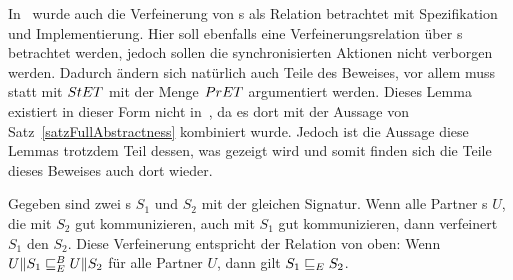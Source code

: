 In~\cite{Vogler2014EIO} wurde auch die Verfeinerung von \EIO{}s als Relation betrachtet
mit Spezifikation und Implementierung. Hier soll ebenfalls eine
Verfeinerungsrelation über \EIO{}s betrachtet werden, jedoch sollen die
synchronisierten Aktionen nicht verborgen werden. Dadurch ändern sich natürlich
auch Teile des Beweises, vor allem muss statt mit $StET{}$ mit der Menge
$PrET{}$ argumentiert werden. Dieses Lemma existiert in dieser Form nicht
in~\cite{Schlosser2012BA}, da es dort mit der Aussage von
Satz~\ref{satzFullAbstractness} kombiniert wurde. Jedoch ist die Aussage diese
Lemmas trotzdem Teil dessen, was gezeigt wird und somit finden sich die Teile
dieses Beweises auch dort wieder.

\begin{lem}
  \label{lemVerfeinerung}
  Gegeben sind zwei \EIO{}s $S_1$ und $S_2$ mit der gleichen Signatur. Wenn
  alle Partner \EIO{}s $U$, die mit $S_2$ gut kommunizieren, auch mit $S_1$ gut
  kommunizieren, dann verfeinert $S_1$ den \EIO{} $S_2$. Diese Verfeinerung
  entspricht der Relation \ERel{} von oben: Wenn $U\|S_1 \sqsubseteq _E^B U\|S_2$ für
  alle Partner $U$, dann gilt $S_1\sqsubseteq _E S_2$.
\end{lem}

